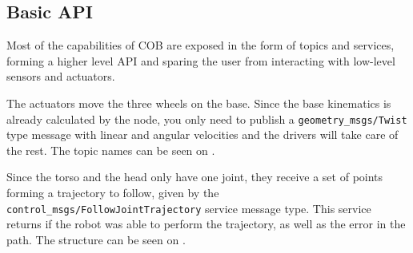 \subsection{Basic API}

Most of the capabilities of COB are exposed in the form of topics and services, forming a higher level API and sparing the user from interacting with low-level sensors and actuators.

The actuators move the three wheels on the base. Since the base kinematics is already calculated by the node, you only need to publish a \texttt{geometry\_msgs/Twist} type message with linear and angular velocities and the drivers will take care of the rest. The topic names can be seen on .

\begin{table}[!ht]
\caption{Base command API.} \label{tab:baseapi}
\renewcommand*{\arraystretch}{1.1}
\end{table}

Since the torso and the head only have one joint, they receive a set of points forming a trajectory to follow, given by the \texttt{control\_msgs/FollowJointTrajectory} service message type. This service returns if the robot was able to perform the trajectory, as well as the error in the path. The structure can be seen on .

